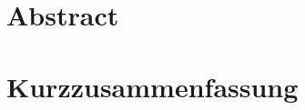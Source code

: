 \documentclass[../main.tex]{subfiles}
\begin{document}
\newpage

\chapter*{Abstract}
	
\chapter*{Kurzzusammenfassung}
\end{document}
